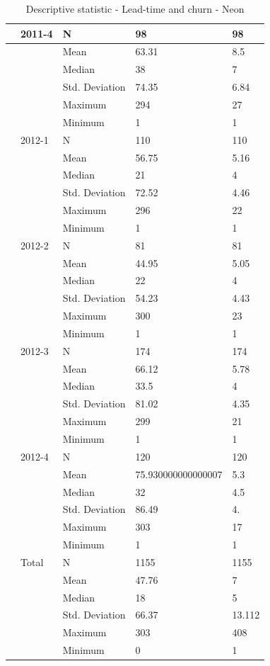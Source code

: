\documentclass[UKenglish]{ifimaster}  %
\begin{document}
\begin{table}[!htbp]
\begin{adjustwidth}{-2cm}{}
{\begin{tabular}{ | l | l | l | l | l | }
	 & 2011-4 & N & 98 & 98 \\ \hline
	 &  & Mean & 63.31 & 8.5 \\ \hline
	 &  & Median & 38 & 7 \\ \hline
	 &  & Std. Deviation & 74.35 & 6.84 \\ \hline
	 &  & Maximum & 294 & 27 \\ \hline
	 &  & Minimum & 1 & 1 \\ \hline
	 & 2012-1 & N & 110 & 110 \\ \hline
	 &  & Mean & 56.75 & 5.16 \\ \hline
	 &  & Median & 21 & 4 \\ \hline
	 &  & Std. Deviation & 72.52 & 4.46 \\ \hline
	 &  & Maximum & 296 & 22 \\ \hline
	 &  & Minimum & 1 & 1 \\ \hline
	 & 2012-2 & N & 81 & 81 \\ \hline
	 &  & Mean & 44.95 & 5.05 \\ \hline
	 &  & Median & 22 & 4 \\ \hline
	 &  & Std. Deviation & 54.23 & 4.43 \\ \hline
	 &  & Maximum & 300 & 23 \\ \hline
	 &  & Minimum & 1 & 1 \\ \hline
	 & 2012-3 & N & 174 & 174 \\ \hline
	 &  & Mean & 66.12 & 5.78 \\ \hline
	 &  & Median & 33.5 & 4 \\ \hline
	 &  & Std. Deviation & 81.02 & 4.35\\ \hline
	 &  & Maximum & 299 & 21 \\ \hline
	 &  & Minimum & 1 & 1 \\ \hline
	 & 2012-4 & N & 120 & 120 \\ \hline
	 &  & Mean & 75.930000000000007 & 5.3 \\ \hline
	 &  & Median & 32 & 4.5 \\ \hline
	 &  & Std. Deviation & 86.49 & 4. \\ \hline
	 &  & Maximum & 303 & 17 \\ \hline
	 &  & Minimum & 1 & 1 \\ \hline
	 & Total & N & 1155 & 1155 \\ \hline
	 &  & Mean & 47.76 & 7 \\ \hline
	 &  & Median & 18 & 5 \\ \hline
	 &  & Std. Deviation & 66.37 & 13.112 \\ \hline
	 &  & Maximum & 303 & 408 \\ \hline
	 &  & Minimum & 0 & 1 \\ \hline
\end{tabular}
}
\caption{Descriptive statistic  - Lead-time and churn - Neon}

\end{adjustwidth}
 \end{table}%
 
\end{document}
